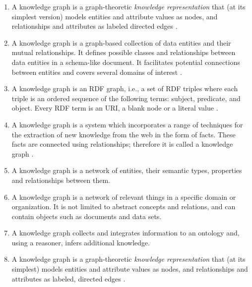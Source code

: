 \begin{enumerate}

    \item A knowledge graph is a graph-theoretic \textit{knowledge representation} that (at its simplest version) models entities and attribute values as nodes, and relationships and attributes as labeled directed edges \cite{kg_swj_issue}.

    \item A knowledge graph is a graph-based collection of data entities and their mutual relationships. It defines possible classes and relationships between data entities in a schema-like document. It facilitates potential connections between entities and covers several domains of interest \cite{DBLP:journals/semweb/Paulheim17}.

    \item A knowledge graph is an RDF graph, i.e., a set of RDF triples where each triple is an ordered sequence of the following terms: subject, predicate, and object. Every RDF term is an URI, a blank node or a literal value \cite{DBLP:journals/semweb/FarberBMR18}.

    \item A knowledge graph is a system which incorporates a range of techniques for the extraction of new knowledge from the web in the form of facts. These facts are connected using relationships; therefore it is called a knowledge graph \cite{DBLP:conf/semweb/PujaraMGC13}.

    \item A knowledge graph is a network of entities, their semantic types, properties and relationships between them.

    \item A knowledge graph is a network of relevant things in a specific domain or organization. It is not limited to abstract concepts and relations, and can contain objects such as documents and data sets.

    \item A knowledge graph collects and integrates information to an ontology and, using a reasoner, infers additional knowledge.

    \item A knowledge graph is a graph-theoretic \textit{knowledge representation} that (at its simplest) models entities and attribute values as nodes, and relationships and attributes as labeled, directed edges \cite{kg_swj_issue}.

\end{enumerate}

